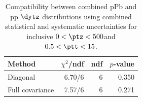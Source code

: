 \begin{table}[htp!]
\centering
\begin{tabular}{|l|r|r|r|}
\hline
Method & $\chi^2$/ndf & ndf & $p$-value \\
\hline
Diagonal & 6.70/6 & 6 & 0.350 \\
Full covariance & 7.57/6 & 6 & 0.271 \\
\hline
\end{tabular}
\caption{Compatibility between combined pPb and pp $\dytz$ distributions using combined statistical and systematic uncertainties for inclusive $0 < \ptz < 500$\GeV and $0.5 < \ptt < 15$\GeV.}
\label{table:chisq_deta}
\end{table}
